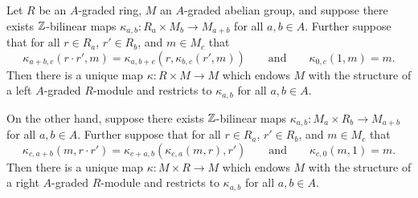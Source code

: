 \documentclass[../main.tex]{subfiles}
\begin{document}
\begin{lemma}\label{A-graded_module}
	Let $R$ be an $A$-graded ring, $M$ an $A$-graded abelian group, and suppose there exists $\mathbb{Z}$-bilinear maps $\kappa_{a,b}:R_a\times M_b\to M_{a+b}$ for all $a,b\in A$. Further suppose that for all $r\in R_a$, $r'\in R_b$, and $m\in M_c$ that
	\[\kappa_{a+b,c}(r\cdot r',m)=\kappa_{a,b+c}(r,\kappa_{b,c}(r',m))\qquad\text{and}\qquad\kappa_{0,c}(1,m)=m.\]
	Then there is a unique map $\kappa:R\times M\to M$ which endows $M$ with the structure of a left $A$-graded $R$-module and restricts to $\kappa_{a,b}$ for all $a,b\in A$.

	On the other hand, suppose there exists $\mathbb{Z}$-bilinear maps $\kappa_{a,b}:M_a\times R_b\to M_{a+b}$ for all $a,b\in A$. Further suppose that for all $r\in R_a$, $r'\in R_b$, and $m\in M_c$ that
	\[\kappa_{c,a+b}(m,r\cdot r')=\kappa_{c+a,b}(\kappa_{c,a}(m,r),r')\qquad\text{and}\qquad\kappa_{c,0}(m,1)=m.\]
	Then there is a unique map $\kappa:M\times R\to M$ which endows $M$ with the structure of a right $A$-graded $R$-module and restricts to $\kappa_{a,b}$ for all $a,b\in A$.
\end{lemma}
\end{document}
